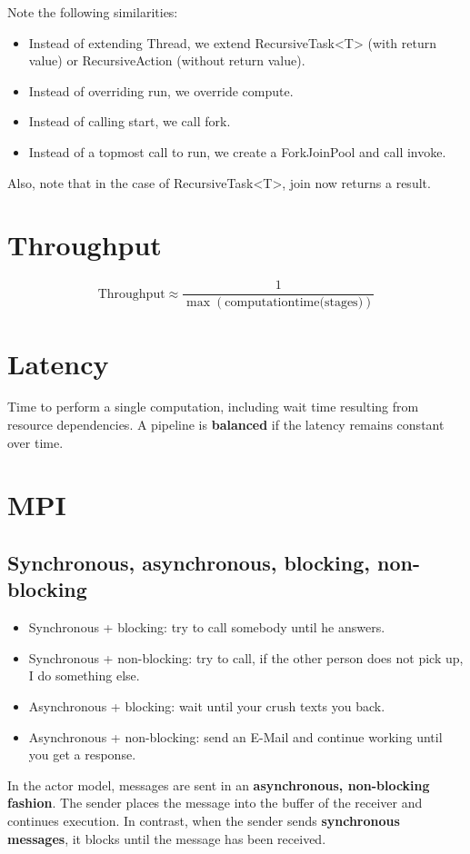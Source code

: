 \documentclass{article}
\begin{document}
Note the following similarities:
\begin{itemize}
    \item Instead of extending Thread, we extend RecursiveTask<T> (with return value) or RecursiveAction (without return value).
    \item Instead of overriding run, we override compute.
    \item Instead of calling start, we call fork.
    \item Instead of a topmost call to run, we create a ForkJoinPool and call invoke.
\end{itemize}
Also, note that in the case of RecursiveTask<T>, join now returns a result.

\section{Throughput}
\begin{equation}
    \text{Throughput} \approx \frac{1}{\max(\text{computationtime(stages)})}
\end{equation}

\section{Latency}
Time to perform a single computation, including wait time resulting from resource dependencies. A pipeline is \textbf{balanced} if the latency remains constant over time.

\section{MPI}
\subsection{Synchronous, asynchronous, blocking, non-blocking}
\begin{itemize}
    \item Synchronous + blocking: try to call somebody until he answers.
    \item Synchronous + non-blocking: try to call, if the other person does not pick up, I do something else.
    \item Asynchronous + blocking: wait until your crush texts you back.
    \item Asynchronous + non-blocking: send an E-Mail and continue working until you get a response.
\end{itemize}
In the actor model, messages are sent in an \textbf{asynchronous, non-blocking fashion}. The sender places the message into the buffer of the receiver and continues execution. In contrast, when the sender sends \textbf{synchronous messages}, it blocks until the message has been received.
\end{document}
